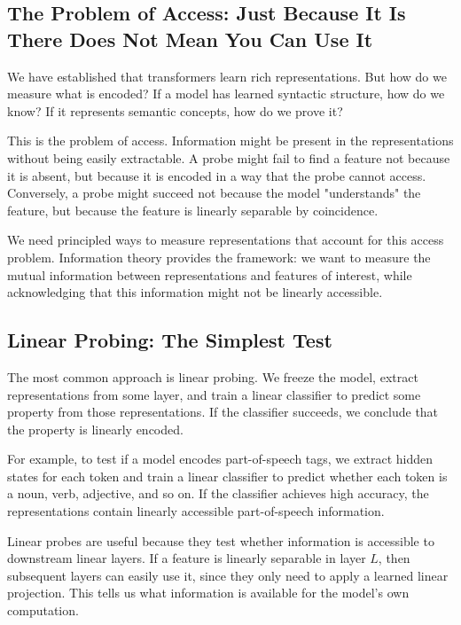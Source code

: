 \vspace{1em}

\subsection{The Problem of Access: Just Because It Is There Does Not Mean You Can Use It}

We have established that transformers learn rich representations. But how do we measure what is encoded? If a model has learned syntactic structure, how do we know? If it represents semantic concepts, how do we prove it?

This is the problem of access. Information might be present in the representations without being easily extractable. A probe might fail to find a feature not because it is absent, but because it is encoded in a way that the probe cannot access. Conversely, a probe might succeed not because the model "understands" the feature, but because the feature is linearly separable by coincidence.

We need principled ways to measure representations that account for this access problem. Information theory provides the framework: we want to measure the mutual information between representations and features of interest, while acknowledging that this information might not be linearly accessible.

\vspace{1.5em}

\subsection{Linear Probing: The Simplest Test}

The most common approach is linear probing. We freeze the model, extract representations from some layer, and train a linear classifier to predict some property from those representations. If the classifier succeeds, we conclude that the property is linearly encoded.

For example, to test if a model encodes part-of-speech tags, we extract hidden states for each token and train a linear classifier to predict whether each token is a noun, verb, adjective, and so on. If the classifier achieves high accuracy, the representations contain linearly accessible part-of-speech information.

Linear probes are useful because they test whether information is accessible to downstream linear layers. If a feature is linearly separable in layer $L$, then subsequent layers can easily use it, since they only need to apply a learned linear projection. This tells us what information is available for the model's own computation.

